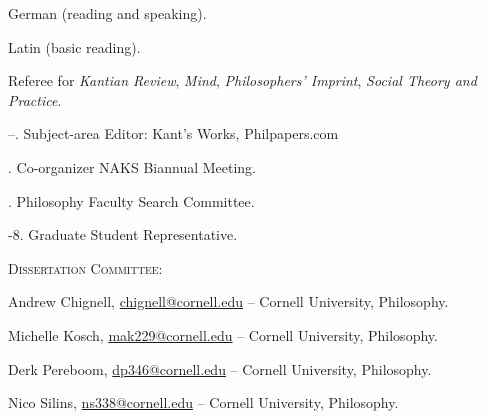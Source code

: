\documentclass[11pt]{article}
\begin{document}

\medskip

\ind German (reading and speaking). 

\ind Latin (basic reading).

\bigskip




  




\medskip

\ind Referee for \emph{Kantian Review}, \emph{Mind}, \emph{Philosophers' Imprint}, \emph{Social Theory and Practice}.

--. Subject-area Editor: Kant's Works, Philpapers.com

. Co-organizer NAKS Biannual Meeting.

. Philosophy Faculty Search Committee.

-8. Graduate Student Representative.

\bigskip

{}
\medskip

\ind \textsc{Dissertation Committee:}
\medskip

\ind Andrew Chignell, \href{mailto:chignell@cornell.edu}{chignell@cornell.edu} – Cornell University, Philosophy.
 
\ind Michelle Kosch, \href{mailto:mak229@cornell.edu}{mak229@cornell.edu} – Cornell University, Philosophy.
 
\ind Derk Pereboom, \href{mailto:dp346@cornell.edu}{dp346@cornell.edu} – Cornell University, Philosophy.

\ind Nico Silins, \href{mailto:ns338@cornell.edu}{ns338@cornell.edu} – Cornell University, Philosophy.
\end{document}
